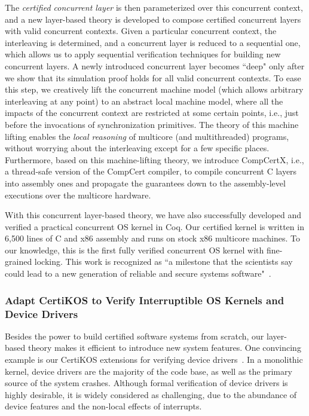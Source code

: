 \documentclass[a4paper, 10pt]{article}
\begin{document}
\begin{small}
The \emph{certified concurrent layer}  is then parameterized over this concurrent context,
and a new layer-based theory is developed to 
compose certified concurrent layers with valid concurrent contexts.
Given a particular concurrent context,
the interleaving is determined,
and a concurrent layer is reduced to a sequential one, which allows us to apply sequential verification techniques for
building new concurrent layers.
A newly introduced concurrent layer becomes ``deep" only after we show that its simulation proof holds for all valid concurrent contexts.
To ease this step, we creatively lift the concurrent machine model (which allows arbitrary interleaving at any point) to an abstract local machine model,
where all the impacts of the concurrent context are restricted at
some certain points, i.e.,
just before the invocations of synchronization primitives. The theory of this machine lifting
enables the \emph{local reasoning} of multicore (and multithreaded) programs,
without worrying about the  interleaving except for a few specific places. 
Furthermore, based on this machine-lifting theory,
we introduce CompCertX, i.e., a thread-safe version of
the CompCert compiler, to compile concurrent C layers
into assembly ones and 
propagate the guarantees down to the assembly-level executions  over the multicore hardware.
 
With this concurrent layer-based theory,
we have also successfully developed and verified a practical concurrent OS
kernel in Coq. Our certified kernel is written in 6,500 lines of
C and x86 assembly and runs on stock x86 multicore
machines. To our knowledge, this is the first fully verified concurrent
OS kernel  with fine-grained locking.
This work is recognized as ``a milestone that the scientists say could lead to a new generation of reliable and secure systems software"~\cite{news}.

\subsubsection*{\small Adapt CertiKOS to Verify Interruptible OS Kernels and Device Drivers}
Besides the power to build certified software systems from  scratch, our layer-based theory makes it efficient to introduce new system features.  
One convincing example is our CertiKOS extensions for verifying device drivers~\cite{pldi16-device}.
In a monolithic kernel,
device drivers are the majority of the code base, as well as the primary source of the system crashes.
Although formal verification of device drivers is highly desirable, it is widely considered as challenging, due to the abundance of device features
and the non-local effects of interrupts.


\end{small}
\end{document}
